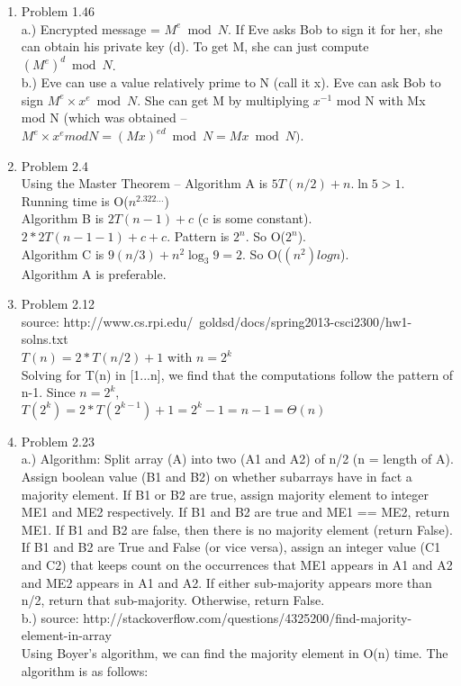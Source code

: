\documentclass{article}
\begin{document}
\begin{enumerate}
	\item
		Problem 1.46\\
		a.) Encrypted message = $M^e \bmod N$. If Eve asks Bob to sign it for her, she can obtain his private key (d). To get M, she can just compute $(M^e)^d \bmod N$.\\
		b.) Eve can use a value relatively prime to N (call it x). Eve can ask Bob to sign $M^e \times x^e \bmod N$. She can get M by multiplying $x^{-1}$ mod N with Mx mod N (which was obtained -- $M^e \times x^e mod N = (Mx)^{ed} \bmod N = Mx \bmod N)$.
		
	\item
		Problem 2.4\\
		Using the Master Theorem --
		Algorithm A is $5T(n/2) + n. \ln 5 > 1$. Running time is O($n^{2.322...}$)\\
		Algorithm B is $2T(n - 1) + c$ (c is some constant). $2 * 2T(n - 1 - 1) + c + c.$ Pattern is $2^n$. So O($2^n$).\\
		Algorithm C is $9(n/3) + n^2 \log_3 9 = 2$. So O($(n^2)logn$).\\
		Algorithm A is preferable.
	\item			 
		Problem 2.12\\
		source: http://www.cs.rpi.edu/~goldsd/docs/spring2013-csci2300/hw1-solns.txt\\
		$T(n) = 2 * T( n/2 ) + 1$  with $n = 2^k $ \\
		Solving for T(n) in [1...n], we find that the computations follow the pattern of n-1. Since $n = 2^k$, \\
		$T(2^k) = 2 * T(2^{k-1}) + 1 = 2^k - 1 = n -1 = \Theta(n)$
		
	\item
		Problem 2.23\\
		a.) Algorithm: Split array (A) into two (A1 and A2) of n/2 (n = length of A). Assign boolean value (B1 and B2) on whether subarrays have in fact a majority element. If B1 or B2 are true, assign majority element to integer ME1 and ME2 respectively. If B1 and B2 are true and ME1 == ME2, return ME1. If B1 and B2 are false, then there is no majority element (return False). If B1 and B2 are True and False (or vice versa), assign an integer value (C1 and C2) that keeps count on the occurrences that ME1 appears in A1 and A2 and ME2 appears in A1 and A2. If either sub-majority appears more than n/2, return that sub-majority. Otherwise, return False. \\
		b.) source: http://stackoverflow.com/questions/4325200/find-majority-element-in-array\\
		Using Boyer's algorithm, we can find the majority element in O(n) time. The algorithm is as follows:
		
		

\end{enumerate}
\end{document}
